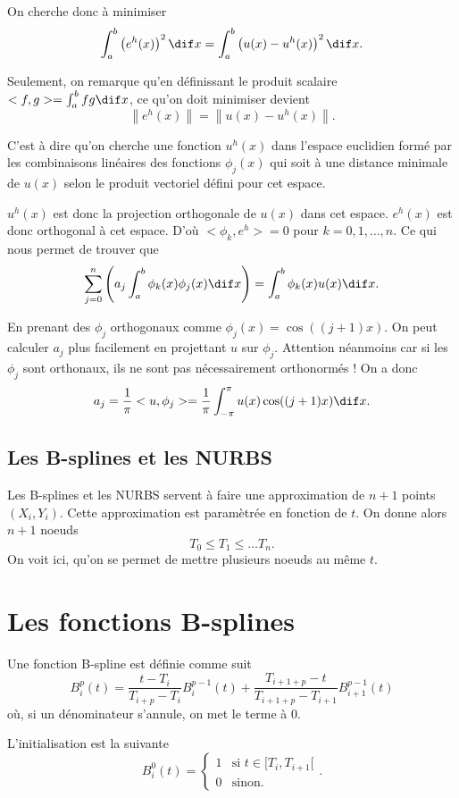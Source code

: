 On cherche donc à minimiser
\[ \int_a^b \left(e^h(x)\right)^2 \dif x =
\int_a^b \left(u(x) - u^h(x)\right)^2 \dif x. \]

Seulement, on remarque qu'en définissant le produit scalaire
$<f, g> = \int_a^b fg \dif x$, ce qu'on doit minimiser devient
\[ \left\|e^h(x)\right\| = \left\|u(x) - u^h(x)\right\|. \]

C'est à dire qu'on cherche une fonction $u^h(x)$ dans l'espace euclidien
formé par les combinaisons linéaires des fonctions $\phi_j(x)$ qui soit
à une distance minimale de $u(x)$ selon le produit vectoriel défini pour
cet espace.

$u^h(x)$ est donc la projection orthogonale de $u(x)$ dans cet espace.
$e^h(x)$ est donc orthogonal à cet espace.
D'où $<\phi_k, e^h> = 0$ pour $k = 0, 1, \ldots, n$.
Ce qui nous permet de trouver que
\[ \sum_{j=0}^n \left(a_j \int_a^b \phi_k(x) \phi_j(x) \dif x\right)
= \int_a^b \phi_k(x) u(x) \dif x. \]

En prenant des $\phi_j$ orthogonaux comme $\phi_j(x) = \cos((j+1)x)$.
On peut calculer $a_j$ plus facilement en projettant $u$ sur $\phi_j$.
Attention néanmoins car si les $\phi_j$ sont orthonaux,
ils ne sont pas nécessairement orthonormés !
On a donc
\[ a_j = \frac{1}{\pi} <u, \phi_j> =
\frac{1}{\pi} \int_{-\pi}^{\pi} u(x) \cos((j+1)x) \dif x. \]

\subsection{Les B-splines et les NURBS}
Les B-splines et les NURBS servent à faire une approximation
de $n+1$ points $(X_i, Y_i)$.
Cette approximation est paramètrée en fonction de $t$.
On donne alors $n+1$ noeuds
\[ T_0 \leq T_1 \leq \ldots T_n. \]
On voit ici, qu'on se permet de mettre plusieurs noeuds au même $t$.

\section{Les fonctions B-splines}
Une fonction B-spline est définie comme suit
\[ B_i^p(t) = \frac{t-T_i}{T_{i+p}-T_i} B_i^{p-1}(t)
+ \frac{T_{i+1+p} - t}{T_{i+1+p} - T_{i+1}}B_{i+1}^{p-1}(t) \]
où, si un dénominateur s'annule, on met le terme à 0.

L'initialisation est la suivante
\[ B_i^0(t) = \left\{\begin{array}{ll}
1 & \text{si }t \in [T_i, T_{i+1}[\\
0 & \text{sinon.}\end{array}\right.. \]

